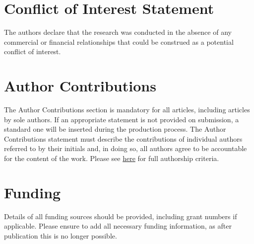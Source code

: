 \documentclass[utf8]{frontiersSCNS} %
\begin{document}




\section*{Conflict of Interest Statement}

The authors declare that the research was conducted in the absence of any commercial or financial relationships that could be construed as a potential conflict of interest.

\section*{Author Contributions}

The Author Contributions section is mandatory for all articles, including articles by sole authors. If an appropriate statement is not provided on submission, a standard one will be inserted during the production process. The Author Contributions statement must describe the contributions of individual authors referred to by their initials and, in doing so, all authors agree to be accountable for the content of the work. Please see  \href{http://home.frontiersin.org/about/author-guidelines#AuthorandContributors}{here} for full authorship criteria.

\section*{Funding}
Details of all funding sources should be provided, including grant numbers if applicable. Please ensure to add all necessary funding information, as after publication this is no longer possible.
\end{document}
